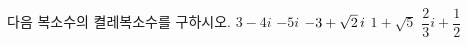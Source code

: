 다음 복소수의 켤레복소수를 구하시오.
 $3-4i$
 $-5i$
 $-3+\sqrt{2}\mkern3mu i$
 $1+\sqrt{5}$
 $\dfrac{2}{3}i+\dfrac{1}{2}$
